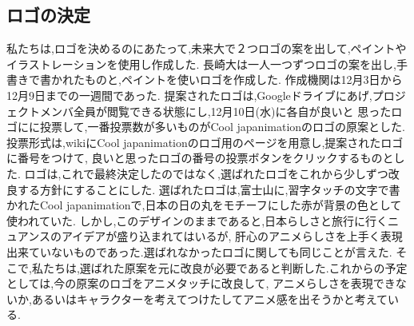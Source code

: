 \subsection{ロゴの決定}
\par
私たちは,ロゴを決めるのにあたって,未来大で２つロゴの案を出して,ペイントやイラストレーションを使用し作成した.
長崎大は一人一つずつロゴの案を出し,手書きで書かれたものと,ペイントを使いロゴを作成した.
作成機関は12月3日から12月9日までの一週間であった.
提案されたロゴは,Googleドライブにあげ,プロジェクトメンバ全員が閲覧できる状態にし,12月10日(水)に各自が良いと
思ったロゴにに投票して,一番投票数が多いものがCool japanimationのロゴの原案とした.
投票形式は,wikiにCool japanimationのロゴ用のページを用意し,提案されたロゴに番号をつけて,
良いと思ったロゴの番号の投票ボタンをクリックするものとした.
ロゴは,これで最終決定したのではなく,選ばれたロゴをこれから少しずつ改良する方針にすることにした.
選ばれたロゴは,富士山に,習字タッチの文字で書かれたCool japanimationで,日本の日の丸をモチーフにした赤が背景の色として使われていた.
しかし,このデザインのままであると,日本らしさと旅行に行くニュアンスのアイデアが盛り込まれてはいるが,
肝心のアニメらしさを上手く表現出来ていないものであった.選ばれなかったロゴに関しても同じことが言えた.
そこで,私たちは,選ばれた原案を元に改良が必要であると判断した.これからの予定としては,今の原案のロゴをアニメタッチに改良して,
アニメらしさを表現できないか,あるいはキャラクターを考えてつけたしてアニメ感を出そうかと考えている.
